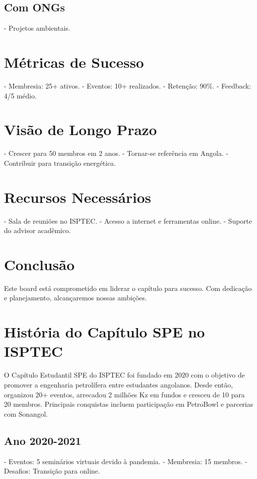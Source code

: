 \documentclass[12pt]{article}
\begin{document}
\subsection{Com ONGs}
- Projetos ambientais.

\section{Métricas de Sucesso}

- Membresia: 25+ ativos.
- Eventos: 10+ realizados.
- Retenção: 90\%.
- Feedback: 4/5 médio.

\section{Visão de Longo Prazo}

- Crescer para 50 membros em 2 anos.
- Tornar-se referência em Angola.
- Contribuir para transição energética.

\section{Recursos Necessários}

- Sala de reuniões no ISPTEC.
- Acesso a internet e ferramentas online.
- Suporte do advisor acadêmico.

\section{Conclusão}

Este board está comprometido em liderar o capítulo para sucesso. Com dedicação e planejamento, alcançaremos nossas ambições.

\section{História do Capítulo SPE no ISPTEC}

O Capítulo Estudantil SPE do ISPTEC foi fundado em 2020 com o objetivo de promover a engenharia petrolífera entre estudantes angolanos. Desde então, organizou 20+ eventos, arrecadou 2 milhões Kz em fundos e cresceu de 10 para 20 membros. Principais conquistas incluem participação em PetroBowl e parcerias com Sonangol.

\subsection{Ano 2020-2021}
- Eventos: 5 seminários virtuais devido à pandemia.
- Membresia: 15 membros.
- Desafios: Transição para online.
\end{document}

